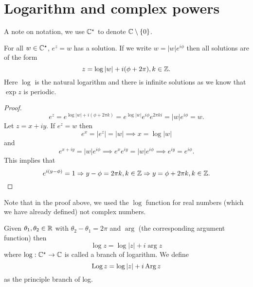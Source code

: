 \section{Logarithm and complex powers}

A note on notation, we use $\mathbb{C}^\star$ to denote $\mathbb{C} \setminus \{0\}$.

\begin{lemma}[]
    For all $w \in \mathbb{C}^\star$, $e^z = w$ has a solution. If we write $w = \lvert w \rvert e^{i\phi}$ then all solutions are of the form \[ z = \log{\lvert w \rvert} + i(\phi + 2\pi), k \in \mathbb{Z}. \] Here $\log$ is the natural logarithm and there is infinite solutions as we know that $\exp{z}$ is periodic.
\end{lemma}

\begin{proof}
    \[ e^z = e^{\log{\lvert w \rvert} + i(\phi + 2\pi k)} = e^{\log{\lvert w \rvert}} e^{i\phi} e^{2\pi ki} = \lvert w \rvert e^{i\phi} = w. \] Let $z = x + iy$. If $e^z = w$ then \[ e^x = \lvert e^z \rvert = \lvert w \rvert \implies x = \log{\lvert w \rvert} \] and \[ e^{x + iy} = \lvert w \rvert e^{i\phi} \implies e^x e^{iy} = \lvert w \rvert e^{i\phi} \implies e^{iy} = e^{i\phi}. \] This implies that \[ e^{i(y - \phi)} = 1 \Rightarrow y - \phi = 2\pi k, k \in \mathbb{Z} \Rightarrow y = \phi + 2\pi k, k \in \mathbb{Z}. \] 
\end{proof}

Note that in the proof above, we used the $\log$ function for real numbers (which we have already defined) not complex numbers.

\begin{definition}[Logarithm]
    Given $\theta_1, \theta_2 \in \mathbb{R}$ with $\theta_2 - \theta_1 = 2\pi$ and $\arg$ (the corresponding argument function) then \[ \log{z} = \log{\lvert z \rvert} + i\arg{z} \] where $\log: \mathbb{C}^\star \to \mathbb{C}$ is called a branch of logarithm. We define \[ \operatorname{Log}{z} = \log{\lvert z \rvert} + i\operatorname{Arg}{z} \] as the principle branch of log.
\end{definition}
